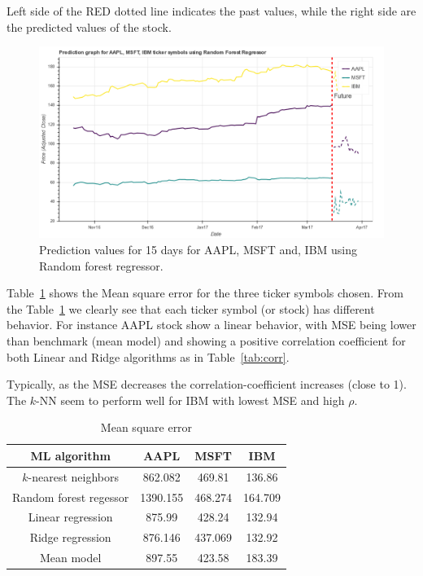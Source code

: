 \documentclass[12pt]{article}
\begin{document}
\begin{itemize}
Left side of the RED dotted line indicates the past values, while the right side are the predicted values of the stock. 

\begin{figure}[!htbp]
\begin{center}
\includegraphics[height=0.4\textheight,width=\textwidth]{rfr_model.png}
\caption{Prediction values for 15 days for AAPL, MSFT and, IBM using Random forest regressor.}
\label{fig:rfr_mdl}
\end{center}
\end{figure}
\end{itemize}

Table~\ref{tab:mse} shows the Mean square error for the three ticker symbols chosen. From the Table~\ref{tab:mse} we clearly see that each ticker symbol (or stock) has different behavior. For instance AAPL stock show a linear behavior, with MSE being lower than benchmark (mean model) and showing a positive correlation coefficient for both Linear and Ridge algorithms as in Table~\ref{tab:corr}. 

Typically, as the MSE decreases the correlation-coefficient increases (close to 1). The $k$-NN seem to perform well for IBM with lowest MSE and high $\rho$.



\begin{table}
\begin{center}
\begin{tabular} {|c|c|c|c|}
\hline \hline
\textbf{ML algorithm} & \textbf{AAPL} & \textbf{MSFT} & \textbf{IBM} \\ \hline
$k$-nearest neighbors & 862.082 & 469.81 & 136.86 \\ \hline
Random forest regessor & 1390.155 & 468.274 & 164.709 \\ \hline
Linear regression &875.99 & 428.24 & 132.94  \\ \hline
Ridge regression & 876.146 & 437.069 & 132.92  \\ \hline
Mean model & 897.55 & 423.58 & 183.39  \\ \hline
\hline
\end{tabular}
\end{center}
\caption{Mean square error}
\label{tab:mse}
\end{table}
\end{document}
